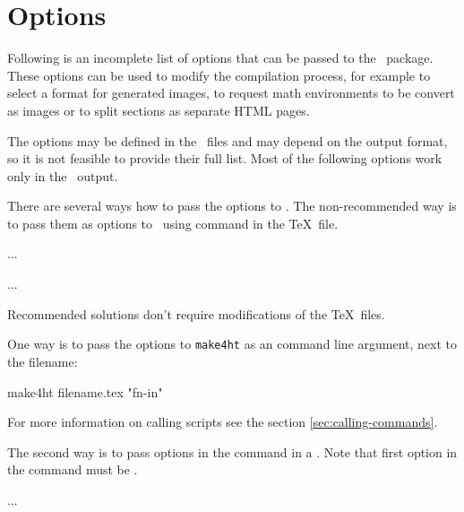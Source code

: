 \chapter{\texfourht{} Options}
\label{chap:options}




Following is an incomplete list of options that can be passed to the \fourhtsty\ package.
These options can be used to modify the compilation process, for example to
select a  format for generated images, to request math environments
to be convert as images or to split sections as separate HTML pages. 

The options may be defined in the \fourhtfile\ files and may depend on the
output format, so it is not feasible to provide their full list. Most of the
following options work only in the \HTML\ output.

There are several ways how to pass the options to \texfourht. The
non-recommended way is to pass them as options to \fourhtsty\ using
\texcommand{\usepackage} command in the \TeX\ file. 

\begin{texsource}
...
\usepackage[xhtml,option1,option2]{tex4ht}
...
\end{texsource}

Recommended solutions don't require modifications of the \TeX\ files.

One way is to pass the options to \texttt{make4ht} as an command line
argument, next to the filename:

\begin{shellcommand}
make4ht filename.tex "fn-in"
\end{shellcommand}

For more information on calling scripts see the section \ref{sec:calling-commands}.

The second way is to pass options in the \texcommand{\Preamble} command in a \cfgfile. Note that first option in the 
\texcommand{\Preamble} command must be .

\begin{texsource}
...

\EndPreamble
\end{texsource}

